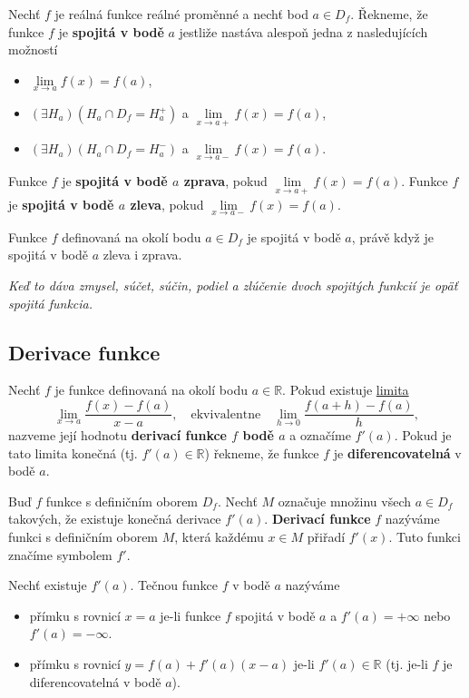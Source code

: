  Nechť $f$ je reálná funkce reálné proměnné a nechť bod $a\in D_f$. Řekneme, že funkce $f$ je \textbf{spojitá v bodě} $a$ jestliže nastáva alespoň jedna z nasledujících možností
\vspace{-5pt}
\begin{itemize}
	\item $\lim\limits_{x\rightarrow a}f(x)=f(a)$,
	\item $(\exists H_a)(H_a\cap D_f=H_a^+)$ a $\lim\limits_{x\rightarrow a+}f(x)=f(a)$,
	\item $(\exists H_a)(H_a\cap D_f=H_a^-)$ a $\lim\limits_{x\rightarrow a-}f(x)=f(a)$.
\end{itemize}
\vspace{-5pt}
Funkce $f$ je \textbf{spojitá v bodě $a$ zprava}, pokud $\lim\limits_{x\rightarrow a+}f(x)=f(a)$. Funkce $f$ je \textbf{spojitá v bodě $a$ zleva}, pokud $\lim\limits_{x\rightarrow a-}f(x)=f(a)$.

\theorem Funkce $f$ definovaná na okolí bodu $a\in D_f$ je spojitá v bodě $a$, právě když je spojitá v bodě $a$ zleva i zprava.

\textit{Keď to dáva zmysel, súčet, súčin, podiel a zlúčenie dvoch spojitých funkcií je opäť spojitá funkcia.}

\subsection{Derivace funkce}

\label{def:derivace} Nechť $f$ je funkce definovaná na okolí bodu $a\in\mathbb{R}$. Pokud existuje \hyperref[def:limita]{limita}
$$
	\lim_{x\rightarrow a}\frac{f(x)-f(a)}{x-a},\quad\mathrm{ekvivalentne}\quad\lim_{h\rightarrow 0}\frac{f(a+h)-f(a)}{h},
$$
nazveme její hodnotu \textbf{derivací funkce $f$ bodě $a$} a označíme $f'(a)$. Pokud je tato limita konečná (tj. $f'(a)\in\mathbb{R}$) řekneme, že funkce $f$ je \textbf{diferencovatelná} v bodě $a$.

 Buď $f$ funkce s definičním oborem $D_f$. Nechť $M$ označuje množinu všech $a \in D_f$ takových, že existuje konečná derivace $f'(a)$. \textbf{Derivací funkce} $f$ nazýváme funkci s definičním oborem $M$, která každému $x \in M$ přiřadí $f'(x)$. Tuto funkci značíme symbolem $f'$.

 Nechť existuje $f'(a)$. Tečnou funkce $f$ v bodě $a$ nazýváme
\vspace{-5pt}
\begin{itemize}
	\item přímku s rovnicí $x = a$ je-li funkce $f$ spojitá v bodě $a$ a $f'(a) = +\infty$ nebo $f' (a) =-\infty$.
	\item přímku s rovnicí $y = f(a) + f'(a)(x - a)$ je-li $f'(a) \in\mathbb{R}$ (tj. je-li $f$ je diferencovatelná v bodě $a$).
\end{itemize}

